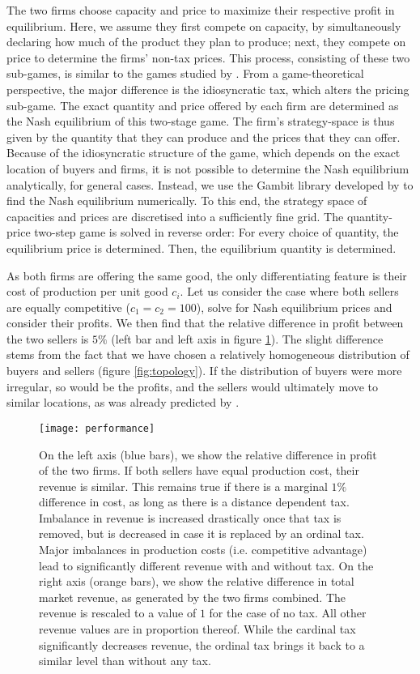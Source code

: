 \documentclass[final,5p,times,twocolumn,11pt,authoryear]{elsarticle}
\numberwithin{equation}{section} %
\begin{document}
The two firms choose capacity and price to maximize their respective profit in equilibrium. 
Here, we assume they first compete on capacity, by simultaneously declaring how much of the product they plan to produce; 
next, they compete on price to determine the firms' non-tax prices. 
This process, consisting of these two sub-games, is similar to the games studied by \cite{Kreps1983}.
From a game-theoretical perspective, the major difference is the idiosyncratic tax, which alters the pricing sub-game.
The exact quantity and price offered by each firm are determined as the Nash equilibrium of this two-stage game. 
The firm's strategy-space is thus given by the quantity that they can produce and the prices that they can offer. 
Because of the idiosyncratic structure of the game, which depends on the exact location of buyers and firms, 
it is not possible to determine the Nash equilibrium analytically, for general cases. 
Instead, we use the Gambit library developed by \cite{McKelvey2016} to find the Nash equilibrium numerically. 
To this end, the strategy space of capacities and prices are discretised into a sufficiently fine grid. 
The quantity-price two-step game is solved in reverse order: 
For every choice of quantity, the equilibrium price is determined.
Then, the equilibrium quantity is determined. 

As both firms are offering the same good, the only differentiating feature is their cost of production per unit good $c_i$.  
Let us consider the case where both sellers are equally competitive ($c_1 = c_2 = 100$), solve for Nash equilibrium prices and consider their profits. 
We then find that the relative difference in profit between the two sellers is $5\%$ (left bar and left axis in figure \ref{fig:results}). 
The slight difference stems from the fact that we have chosen a relatively homogeneous distribution of buyers and sellers (figure \ref{fig:topology}).
If the distribution of buyers were more irregular, so would be the profits, and the sellers would ultimately move to similar locations, as was already predicted by \cite{Hotelling1929}.

\begin{figure}[!htb]
	\centering
	\texttt{[image: performance]}
	\caption{	On the left axis (blue bars), we show the relative difference in profit of the two firms.
			If both sellers have equal production cost, their revenue is similar. 
			This remains true if there is a marginal $1\%$ difference in cost, as long as there is a distance dependent tax. 
			Imbalance in revenue is increased drastically once that tax is removed, but is decreased in case it is replaced by an ordinal tax. 
			Major imbalances in production costs (i.e. competitive advantage) lead to significantly different revenue with and without tax. 
			On the right axis (orange bars), we show the relative difference in total market revenue, as generated by the two firms combined. 
			The revenue is rescaled to a value of $1$ for the case of no tax. 
			All other revenue values are in proportion thereof. 
			While the cardinal tax significantly decreases revenue, the ordinal tax brings it back to a similar level than without any tax. 
			}
	\label{fig:results}
\end{figure}
\end{document}
